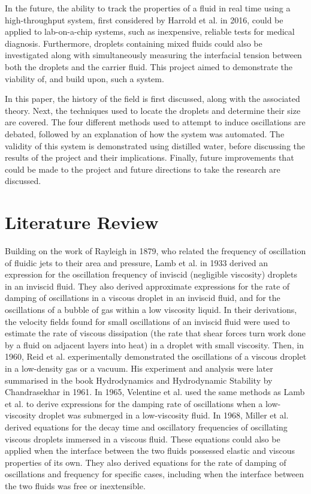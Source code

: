 \documentclass{physics_article_B}
\begin{document}
    In the future, the ability to track the properties of a fluid in real time using a high-throughput system, first considered by Harrold et al. in 2016\cite{harrold}, could be applied to lab-on-a-chip systems, such as inexpensive, reliable tests\cite{yager} for medical diagnosis. Furthermore, droplets containing mixed fluids could also be investigated along with simultaneously measuring the interfacial tension between both the droplets and the carrier fluid\cite{Backholm2017}. This project aimed to demonstrate the viability of, and build upon, such a system.
    
    In this paper, the history of the field is first discussed, along with the associated theory. Next, the techniques used to locate the droplets and determine their size are covered. The four different methods used to attempt to induce oscillations are debated, followed by an explanation of how the system was automated. The validity of this system is demonstrated using distilled water, before discussing the results of the project and their implications. Finally, future improvements that could be made to the project and future directions to take the research are discussed.

\newpage\section{Literature Review\label{sect:lit}}

    Building on the work of Rayleigh in 1879, who related the frequency of oscillation of fluidic jets to their area and pressure\cite{rayleigh}, Lamb et al.\cite{lamb} in 1933 derived an expression for the oscillation frequency of inviscid (negligible viscosity) droplets in an inviscid fluid. They also derived approximate expressions for the rate of damping of oscillations in a viscous droplet in an inviscid fluid, and for the oscillations of a bubble of gas within a low viscosity liquid. In their derivations, the velocity fields found for small oscillations of an inviscid fluid were used to estimate the rate of viscous dissipation (the rate that shear forces turn work done by a fluid on adjacent layers into heat) in a droplet with small viscosity\cite{lamb}. Then, in 1960, Reid et al. experimentally demonstrated the oscillations of a viscous droplet in a low-density gas or a vacuum\cite{reid}. His experiment and analysis were later summarised in the book Hydrodynamics and Hydrodynamic Stability by Chandrasekhar in 1961\cite{chandrasekhar}. In 1965, Velentine et al. used the same methods as Lamb et al. to derive expressions for the damping rate of oscillations when a low-viscosity droplet was submerged in a low-viscosity fluid\cite{velentine}. In 1968, Miller et al.\cite{miller} derived equations for the decay time and oscillatory frequencies of oscillating viscous droplets immersed in a viscous fluid. These equations could also be applied when the interface between the two fluids possessed elastic and viscous properties of its own. They also derived equations for the rate of damping of oscillations and frequency for specific cases, including when the interface between the two fluids was free or  inextensible.
    
\end{document}
